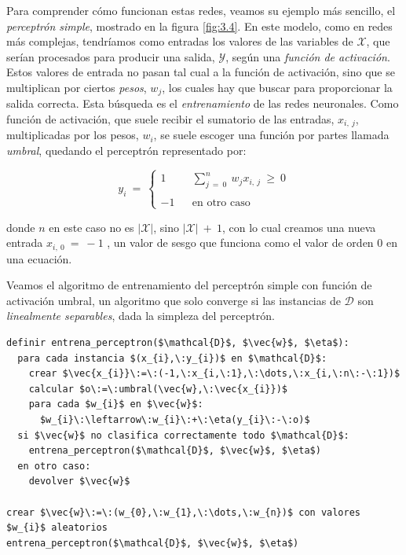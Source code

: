 Para comprender cómo funcionan estas redes, veamos su ejemplo más sencillo, el \emph{perceptrón simple}, mostrado en la figura \ref{fig:3.4}. En este modelo, como en redes más complejas, tendríamos como entradas los valores de las variables de $\mathcal{X}$, que serían procesados para producir una salida, $\mathcal{Y}$, según una \emph{función de activación}. Estos valores de entrada no pasan tal cual a la función de activación, sino que se multiplican por ciertos \emph{pesos}, $w_{j}$, los cuales hay que buscar para proporcionar la salida correcta. Esta búsqueda es el \emph{entrenamiento} de las redes neuronales. Como función de activación, que suele recibir el sumatorio de las entradas, $x_{i,\:j}$, multiplicadas por los pesos, $w_{i}$, se suele escoger una función por partes llamada \emph{umbral}, quedando el perceptrón representado por:

$$
y_{i}\:=\:\left\{{\begin{array}{*{3}{c}}
  1 & & \sum_{j\:=\:0}^{n}\:w_{j}x_{i,\:j}\:\geq\:0 \\
  \\
  -1 & & \textrm{en otro caso}
\end{array}} \right.
$$

\noindent
donde $n$ en este caso no es $|\mathcal{X}|$, sino $|\mathcal{X}|\:+\:1$, con lo cual creamos una nueva entrada $x_{i,\:0}\:=\:-1$ , un valor de sesgo que funciona como el valor de orden $0$ en una ecuación.

Veamos el algoritmo de entrenamiento del perceptrón simple con función de activación umbral, un algoritmo que solo converge si las instancias de $\mathcal{D}$ son \emph{linealmente separables}, dada la simpleza del perceptrón.

\vspace*{3mm}
\lstset{style=pseudocode}
\begin{lstlisting}
definir entrena_perceptron($\mathcal{D}$, $\vec{w}$, $\eta$):
  para cada instancia $(x_{i},\:y_{i})$ en $\mathcal{D}$:
    crear $\vec{x_{i}}\:=\:(-1,\:x_{i,\:1},\:\dots,\:x_{i,\:n\:-\:1})$
    calcular $o\:=\:umbral(\vec{w},\:\vec{x_{i}})$
    para cada $w_{i}$ en $\vec{w}$:
      $w_{i}\:\leftarrow\:w_{i}\:+\:\eta(y_{i}\:-\:o)$
  si $\vec{w}$ no clasifica correctamente todo $\mathcal{D}$:
    entrena_perceptron($\mathcal{D}$, $\vec{w}$, $\eta$)
  en otro caso:
    devolver $\vec{w}$

crear $\vec{w}\:=\:(w_{0},\:w_{1},\:\dots,\:w_{n})$ con valores $w_{i}$ aleatorios
entrena_perceptron($\mathcal{D}$, $\vec{w}$, $\eta$)
\end{lstlisting}

